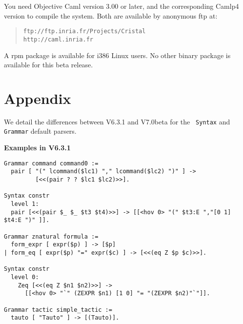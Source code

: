\documentclass[11pt]{article}
\begin{document}
You need Objective Caml version 3.00 or later, and the corresponding 
Camlp4 version to compile the system. Both are available by anonymous ftp
at:

\begin{quote}
\verb|ftp://ftp.inria.fr/Projects/Cristal|\\
\verb|http://caml.inria.fr|
\end{quote}

\noindent
%

A rpm package is available for i386 Linux users. No other binary
package is available for this beta release.

%

%
%

\section*{Appendix}
\label{Appendix}
We detail the differences between {\Coq} V6.3.1 and V7.0beta for the {\tt
Syntax} and {\tt Grammar} default parsers.

\medskip

{\bf Examples in V6.3.1}

\begin{verbatim}
Grammar command command0 :=
  pair [ "(" lcommand($lc1) "," lcommand($lc2) ")" ] ->
         [<<(pair ? ? $lc1 $lc2)>>].

Syntax constr
  level 1:
  pair [<<(pair $_ $_ $t3 $t4)>>] -> [[<hov 0> "(" $t3:E ","[0 1] $t4:E ")" ]].

Grammar znatural formula :=
  form_expr [ expr($p) ] -> [$p]
| form_eq [ expr($p) "=" expr($c) ] -> [<<(eq Z $p $c)>>].

Syntax constr
  level 0:
    Zeq [<<(eq Z $n1 $n2)>>] -> 
      [[<hov 0> "`" (ZEXPR $n1) [1 0] "= "(ZEXPR $n2)"`"]].

Grammar tactic simple_tactic :=
  tauto [ "Tauto" ] -> [(Tauto)].
\end{verbatim}
\end{document}
